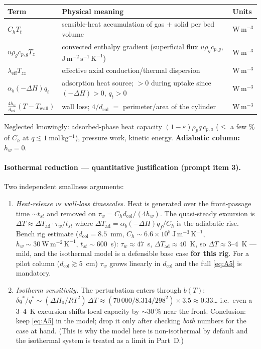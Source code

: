 \documentclass[11pt]{article}
\theoremstyle{remark}
\newcommand{\dcol}{d_{\mathrm{col}}}
\newcommand{\Twall}{T_{\mathrm{wall}}}
\newcommand{\lameff}{\lambda_{\mathrm{eff}}}
\newcommand{\DTad}{\Delta T_{\mathrm{ad}}}
\begin{document}
\begin{center}
\begin{tabular}{@{}l l l@{}}
\toprule
Term & Physical meaning & Units \\
\midrule
$C_h T_t$ & sensible-heat accumulation of gas $+$ solid per bed volume & $\mathrm{W\,m^{-3}}$ \\
$u\rho_g c_{p,g} T_z$ & convected enthalpy gradient (superficial flux $u\rho_g c_{p,g}$,
  $\mathrm{J\,m^{-2}\,s^{-1}\,K^{-1}}$) & $\mathrm{W\,m^{-3}}$ \\
$\lameff T_{zz}$ & effective axial conduction/thermal dispersion & $\mathrm{W\,m^{-3}}$ \\
$\alpha_b(-\Delta H) q_t$ & adsorption heat source; $>0$ during uptake since
  $(-\Delta H)>0$, $q_t>0$ & $\mathrm{W\,m^{-3}}$ \\
$\tfrac{4h_w}{\dcol}(T-\Twall)$ & wall loss; $4/\dcol$ $=$ perimeter/area of the
  cylinder & $\mathrm{W\,m^{-3}}$ \\
\bottomrule
\end{tabular}
\end{center}

Neglected knowingly: adsorbed-phase heat capacity
$(1-\varepsilon)\rho_p q\,c_{p,a}$ ($\le$ a few \% of $C_h$ at
$q\lesssim1~\mathrm{mol\,kg^{-1}}$), pressure work, kinetic energy.
\textbf{Adiabatic column:} $h_w=0$.

\paragraph{Isothermal reduction --- quantitative justification (prompt item 3).}
Two independent smallness arguments:
\begin{enumerate}
\item \emph{Heat-release vs wall-loss timescales.} Heat is generated over the
front-passage time ${\sim}t_{st}$ and removed on $\tau_w = C_h \dcol/(4h_w)$.
The quasi-steady excursion is $\Delta T \approx \DTad\cdot \tau_w/t_{st}$ where
$\DTad=\alpha_b(-\Delta H)q_f/C_h$ is the adiabatic rise. Bench rig estimate
($\dcol=8.5$~mm, $C_h\sim6.6\times10^{5}~\mathrm{J\,m^{-3}\,K^{-1}}$,
$h_w\sim30~\mathrm{W\,m^{-2}\,K^{-1}}$, $t_{st}\sim600$~s):
$\tau_w\approx47$~s, $\DTad\approx40$~K, so $\Delta T\approx3$--$4$~K --- mild,
and the isothermal model is a defensible base case \textbf{for this rig}. For a
pilot column ($\dcol\gtrsim5$~cm) $\tau_w$ grows linearly in $\dcol$ and the
full \eqref{eq:A5} is mandatory.
\item \emph{Isotherm sensitivity.} The perturbation enters through $b(T)$:
$\delta q^*/q^* \sim (\Delta H_0/RT^2)\,\Delta T
\approx (70\,000/8.314/298^2)\times 3.5 \approx 0.33$\ldots{} i.e.\ even a
3--4~K excursion shifts local capacity by ${\sim}30\,\%$ near the front.
Conclusion: keep \eqref{eq:A5} in the model; drop it only after checking
\emph{both} numbers for the case at hand. (This is why the model here is
non-isothermal by default and the isothermal system is treated as a limit in
Part~D.)
\end{enumerate}
\end{document}
